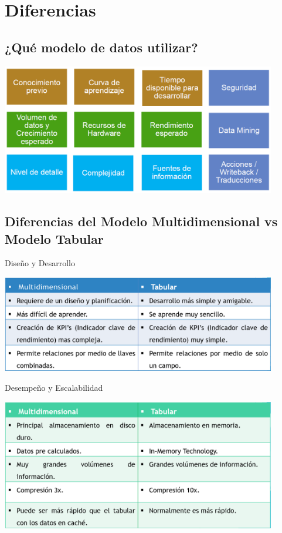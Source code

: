 \documentclass[preprint,12pt]{elsarticle}
\begin{document}
\section{Diferencias}

\subsection{¿Qué modelo de datos utilizar? }

\begin{center}
	\includegraphics[width=12cm]{./Imagenes/dif0} 
\end{center}


\subsection{Diferencias del Modelo Multidimensional vs Modelo Tabular}

Diseño y Desarrollo\\
\begin{center}
	\includegraphics[width=12cm]{./Imagenes/dif1} 
\end{center}
\pagebreak
Desempeño y Escalabilidad\\
\begin{center}
	\includegraphics[width=12cm]{./Imagenes/dif2} 
\end{center}
\end{document}
